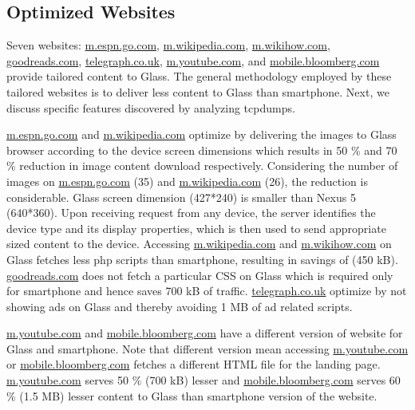 \documentclass{sig-alternate-10pt}
\begin{document}
  






\subsection{Optimized Websites}
Seven websites: \url{m.espn.go.com}, \url{m.wikipedia.com},  \url{m.wikihow.com}, \url{goodreads.com}, \url{telegraph.co.uk}, \url{m.youtube.com}, and \url{mobile.bloomberg.com} provide tailored content  to Glass. The general methodology employed by these tailored websites is to deliver less content to Glass than smartphone.  Next, we discuss specific features discovered by analyzing tcpdumps. 

  \url{m.espn.go.com} and \url{m.wikipedia.com}  optimize by delivering the images to Glass  browser according to the device  screen dimensions which results in 50 \% and 70 \% reduction in image content download respectively.   Considering the number of images on \url{m.espn.go.com} (35) and \url{m.wikipedia.com} (26), the reduction is considerable.   Glass screen dimension (427*240) is smaller than Nexus 5 (640*360). Upon receiving request  from any device, the  server identifies the device type and its display properties,
which is then used to send appropriate sized content to the device. Accessing  \url{m.wikipedia.com}  and \url{m.wikihow.com} on Glass fetches less php scripts than smartphone, resulting in savings of (450 kB).  \url{goodreads.com} does not fetch a particular CSS on Glass which is required only for smartphone and hence saves 700 kB of traffic. \url{telegraph.co.uk}  optimize by not  showing ads on Glass and  thereby avoiding 1 MB of ad related scripts.

\url{m.youtube.com} and \url{mobile.bloomberg.com} have a different version of website for Glass and smartphone. Note that  different version  mean accessing \url{m.youtube.com} or \url{mobile.bloomberg.com} fetches a different HTML file for the landing page.  \url{m.youtube.com}  serves 50 \% (700 kB) lesser  and \url{mobile.bloomberg.com} serves 60 \% (1.5 MB) lesser content to Glass than smartphone version of the website.
\end{document}
